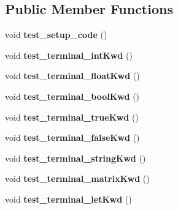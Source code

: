\subsection*{Public Member Functions}
\begin{DoxyCompactItemize}
\item 
\hypertarget{classScannerTestSuite_ade832b9b4b3bd92980d43c4050cebd2c}{void {\bfseries test\-\_\-setup\-\_\-code} ()}\label{classScannerTestSuite_ade832b9b4b3bd92980d43c4050cebd2c}

\item 
\hypertarget{classScannerTestSuite_af42f8338bfe7b397ea39f565157f64cc}{void {\bfseries test\-\_\-terminal\-\_\-int\-Kwd} ()}\label{classScannerTestSuite_af42f8338bfe7b397ea39f565157f64cc}

\item 
\hypertarget{classScannerTestSuite_a5c55d99dbc84996abd740fbabb36314b}{void {\bfseries test\-\_\-terminal\-\_\-float\-Kwd} ()}\label{classScannerTestSuite_a5c55d99dbc84996abd740fbabb36314b}

\item 
\hypertarget{classScannerTestSuite_a919ec02392d67e0932affc229b1e72c8}{void {\bfseries test\-\_\-terminal\-\_\-bool\-Kwd} ()}\label{classScannerTestSuite_a919ec02392d67e0932affc229b1e72c8}

\item 
\hypertarget{classScannerTestSuite_a88607da81181c529df9b9edf246dfff6}{void {\bfseries test\-\_\-terminal\-\_\-true\-Kwd} ()}\label{classScannerTestSuite_a88607da81181c529df9b9edf246dfff6}

\item 
\hypertarget{classScannerTestSuite_a6a4395c74f53b0ff0024d6a81999d1b4}{void {\bfseries test\-\_\-terminal\-\_\-false\-Kwd} ()}\label{classScannerTestSuite_a6a4395c74f53b0ff0024d6a81999d1b4}

\item 
\hypertarget{classScannerTestSuite_a141d32b206981d44cbdbf478a20be967}{void {\bfseries test\-\_\-terminal\-\_\-string\-Kwd} ()}\label{classScannerTestSuite_a141d32b206981d44cbdbf478a20be967}

\item 
\hypertarget{classScannerTestSuite_ae2d7798c81ef50444efe99f5c7a89148}{void {\bfseries test\-\_\-terminal\-\_\-matrix\-Kwd} ()}\label{classScannerTestSuite_ae2d7798c81ef50444efe99f5c7a89148}

\item 
\hypertarget{classScannerTestSuite_aa35e7a92f4fdb1b6014ef0ca9df60ecc}{void {\bfseries test\-\_\-terminal\-\_\-let\-Kwd} ()}\label{classScannerTestSuite_aa35e7a92f4fdb1b6014ef0ca9df60ecc}


\end{DoxyCompactItemize}
